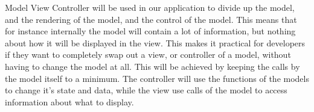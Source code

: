 Model View Controller \cite{wiki:mvc} will be used in our application to divide up the model, and the rendering of the model, and the control of the model. This means that for instance internally the model will contain a lot of information, but nothing about how it will be displayed in the view. This makes it practical for developers if they want to completely swap out a view, or controller of a model, without having to change the model at all. This will be achieved by keeping the calls by the model itself to a minimum. The controller will use the functions of the models to change it's state and data, while the view use calls of the model to access information about what to display.
